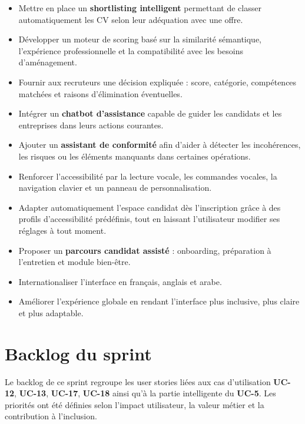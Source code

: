 \documentclass[12pt,a4paper]{report}
\begin{document}
\begin{itemize}
  \item Mettre en place un \textbf{shortlisting intelligent} permettant de classer automatiquement les CV selon leur adéquation avec une offre.
  \item Développer un moteur de scoring basé sur la similarité sémantique, l'expérience professionnelle et la compatibilité avec les besoins d'aménagement.
  \item Fournir aux recruteurs une décision expliquée : score, catégorie, compétences matchées et raisons d'élimination éventuelles.
  \item Intégrer un \textbf{chatbot d'assistance} capable de guider les candidats et les entreprises dans leurs actions courantes.
  \item Ajouter un \textbf{assistant de conformité} afin d'aider à détecter les incohérences, les risques ou les éléments manquants dans certaines opérations.
  \item Renforcer l'accessibilité par la lecture vocale, les commandes vocales, la navigation clavier et un panneau de personnalisation.
  \item Adapter automatiquement l'espace candidat dès l'inscription grâce à des profils d'accessibilité prédéfinis, tout en laissant l'utilisateur modifier ses réglages à tout moment.
  \item Proposer un \textbf{parcours candidat assisté} : onboarding, préparation à l'entretien et module bien-être.
  \item Internationaliser l'interface en français, anglais et arabe.
  \item Améliorer l'expérience globale en rendant l'interface plus inclusive, plus claire et plus adaptable.
\end{itemize}

\section{Backlog du sprint}

Le backlog de ce sprint regroupe les user stories liées aux cas d'utilisation \textbf{UC-12}, \textbf{UC-13}, \textbf{UC-17}, \textbf{UC-18} ainsi qu'à la partie intelligente du \textbf{UC-5}. Les priorités ont été définies selon l'impact utilisateur, la valeur métier et la contribution à l'inclusion.
\end{document}
